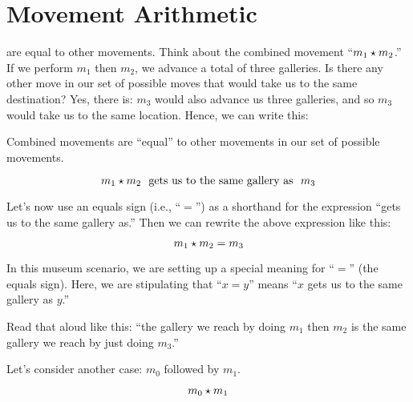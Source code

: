 \documentclass[../../../main.tex]{subfiles}
\begin{document}
\section{Movement Arithmetic}

 are equal to other movements. Think about the combined movement ``$m_{1} \opSymbol/ m_{2}$.'' If we perform $m_{1}$ then $m_{2}$, we advance a total of three galleries. Is there any other move in our set of possible moves that would take us to the same destination? Yes, there is: $m_{3}$ would also advance us three galleries, and so $m_{3}$ would take us to the same location. Hence, we can write this:

\begin{aside}
  \begin{remark}
    Combined movements are ``equal'' to other movements in our set of possible movements.
  \end{remark}
\end{aside}

\begin{equation*}
  m_{1} \opSymbol/ m_{2} \text{~~gets us to the same gallery as~~} m_{3}
\end{equation*}

Let's now use an equals sign (i.e., ``$=$'') as a shorthand for the expression ``gets us to the same gallery as.'' Then we can rewrite the above expression like this:

\begin{equation*}
  m_{1} \opSymbol/ m_{2} = m_{3}
\end{equation*}

\begin{aside}
  \begin{notation}
    In this museum scenario, we are setting up a special meaning for ``$=$'' (the equals sign). Here, we are stipulating that ``$x = y$'' means ``$x$ gets us to the same gallery as $y$.''
  \end{notation}
\end{aside}

Read that aloud like this: ``the gallery we reach by doing $m_{1}$ then $m_{2}$ is the same gallery we reach by just doing $m_{3}$.''

Let's consider another case: $m_{0}$ followed by $m_{1}$.

\begin{equation*}
  m_{0} \opSymbol/ m_{1}
\end{equation*}
\end{document}
